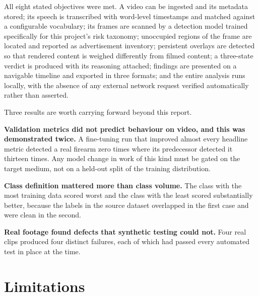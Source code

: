 \documentclass[
12pt,
a4paper,
oneside
]{report}
\begin{document}
All eight stated objectives were met. A video can be ingested and its metadata
stored; its speech is transcribed with word-level timestamps and matched against
a configurable vocabulary; its frames are scanned by a detection model trained
specifically for this project's risk taxonomy; unoccupied regions of the frame
are located and reported as advertisement inventory; persistent overlays are
detected so that rendered content is weighed differently from filmed content; a
three-state verdict is produced with its reasoning attached; findings are
presented on a navigable timeline and exported in three formats; and the entire
analysis runs locally, with the absence of any external network request verified
automatically rather than asserted.

Three results are worth carrying forward beyond this report.

\textbf{Validation metrics did not predict behaviour on video, and this was
demonstrated twice.} A fine-tuning run that improved almost every headline
metric detected a real firearm zero times where its predecessor detected it
thirteen times. Any model change in work of this kind must be gated on the
target medium, not on a held-out split of the training distribution.

\textbf{Class definition mattered more than class volume.} The class with the
most training data scored worst and the class with the least scored
substantially better, because the labels in the source dataset overlapped in the
first case and were clean in the second.

\textbf{Real footage found defects that synthetic testing could not.} Four real
clips produced four distinct failures, each of which had passed every automated
test in place at the time.

\section{Limitations}
\end{document}
